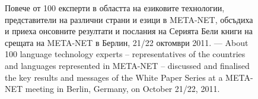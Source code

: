 \documentclass[]{../../metanetpaper}
\begin{document}
\begin{figure}[htb]
  \center
{}
  \caption{Повече от 100 експерти в областта на езиковите технологии, представители на различни страни и езици в META-NET, обсъдиха и приеха онсовните резултати и послания на Серията Бели книги на срещата на  META-NET в Берлин, 21/22 октомври 2011. --- \textcolor{grey1}{About 100 language technology experts -- representatives of the countries and languages represented in META-NET -- discussed and finalised the key results and messages of the White Paper Series at a META-NET meeting in Berlin, Germany, on October 21/22, 2011.}}
  \medskip
\end{figure}

\cleardoublepage

\label{whitepaperseries}
\end{document}
